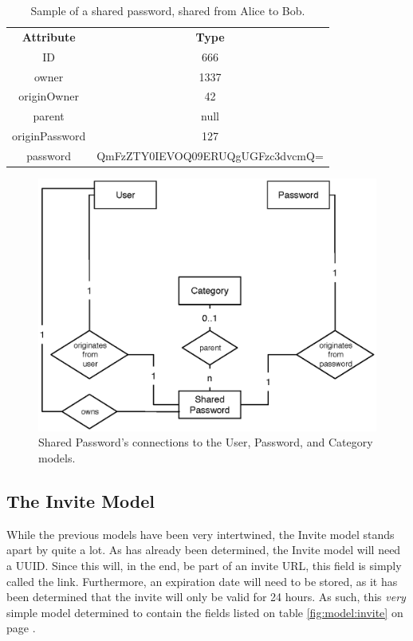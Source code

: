 			\begin{table}[p]
				\centering
				\begin{tabular}{c|c}
					\textbf{Attribute} 		& \textbf{Type} 											\\
					ID 						& 666 														\\
					owner 					& 1337 														\\
					originOwner 			& 42 														\\
					parent 					& null 														\\
					originPassword			& 127 														\\
					password				& QmFzZTY0IEVOQ09ERUQgUGFzc3dvcmQ= 							\\
				\end{tabular}
				\caption{Sample of a shared password, shared from Alice to Bob.}
				\label{fig:example:sharedpassword:sampleshare}
			\end{table}

			\begin{figure}[p]
				\centering
				\includegraphics[scale=0.75]{figures/design/uml/erd/user-category-password-sharedpassword.eps}
				\caption{Shared Password's connections to the User, Password, and Category models.}
				\label{fig:relationship:sharedpassword}
			\end{figure}

		\subsection{The Invite Model}
			While the previous models have been very intertwined, the Invite model stands apart by quite a lot. As has already been determined, the Invite model will need a UUID. Since this will, in the end, be part of an invite URL, this field is simply called the link. Furthermore, an expiration date will need to be stored, as it has been determined that the invite will only be valid for 24 hours. As such, this \emph{very} simple model determined to contain the fields listed on table \ref{fig:model:invite} on page \pageref{fig:model:invite}. 
			
